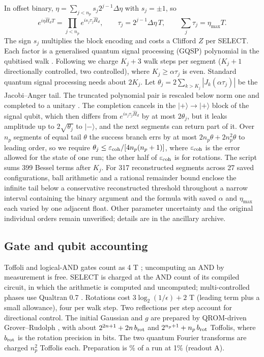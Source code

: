 \documentclass[11pt,a4paper]{article}
\theoremstyle{remark}
\newcommand{\Hd}{\hat H_d}
\newcommand{\eps}{\varepsilon}
\begin{document}
In offset binary, $\eta=\sum_{j<n_p}s_j2^{j-1}\Delta\eta$ with $s_j=\pm1$, so
\begin{equation}
 e^{i\eta\Hd T}=\prod_{j<n_p}e^{is_j\tau_j\Hd},\qquad
 \tau_j=2^{j-1}\Delta\eta\,T,\qquad\sum_j\tau_j=\eta_{\max}T .
 \label{eq:segments}
\end{equation}
The sign $s_j$ multiplies the block encoding and costs a Clifford $Z$ per
SELECT. Each factor is a generalised quantum signal processing (GQSP)
polynomial \cite{gqsp} in the qubitised walk \cite{qubitization}. Following
\cite{berry} we charge $K_j+3$ walk steps per segment ($K_j+1$ directionally controlled, two
controlled), where $K_j\ge\alpha\tau_j$ is even. Standard quantum signal processing needs about
$2K_j$. Let $\theta_j=2\sum_{k>K_j}|J_k(\alpha\tau_j)|$ be the Jacobi--Anger tail. The truncated
polynomial pair is rescaled below norm one and completed to a unitary \cite{berry}. The
completion cancels in the $|+\rangle\to|+\rangle$ block of the signal qubit, which then differs from
$e^{is_j\tau_j\Hd}$ by at most $2\theta_j$, but it leaks amplitude up to $2\sqrt{\theta_j}$ to
$|-\rangle$, and the next segments can return part of it. Over $n_p$ segments of equal tail
$\theta$ the success branch errs by at most $2n_p\theta+2n_p^2\theta$ to leading order, so we require
$\theta_j\le\eps_{\rm coh}/[4n_p(n_p+1)]$, where $\eps_{\rm coh}$ is the error allowed for the
state of one run; the other half of $\eps_{\rm coh}$ is for rotations.
The script sums 399 Bessel terms after $K_j$. For 317 reconstructed segments
across 27 saved configurations, ball arithmetic and a rational remainder
bound enclose the infinite tail below a conservative reconstructed threshold
throughout a narrow interval containing the binary argument and the formula
with saved $\alpha$ and $\eta_{\max}$ each varied by one adjacent float.
Other parameter uncertainty and the original
individual orders remain unverified; details are in the ancillary archive.

\subsection{Gate and qubit accounting}
\label{sec:account}

Toffoli and logical-AND gates count as 4 T \cite{gidney}; uncomputing an AND
by measurement is free. SELECT is charged at the AND count of its compiled circuit, in which the arithmetic is computed and
uncomputed; multi-controlled phases use Qualtran 0.7 \cite{qualtran}. Rotations cost
$3\log_2(1/\epsilon)+2$ T \cite{rs} (leading term plus a small allowance),
four per walk step. Two reflections per step account for directional control.
The initial Gaussian and $g$ are prepared by QROM-driven Grover--Rudolph
\cite{gr,babbush}, with about $2^{2n+1}+2n\,b_{\rm rot}$ and
$2^{n_p+1}+n_p\,b_{\rm rot}$ Toffolis, where $b_{\rm rot}$ is the rotation
precision in bits. The two quantum Fourier transforms
are charged $n_p^2$ Toffolis each. Preparation is \PrepShareA\% of a run at
1\% (readout A).
\end{document}

